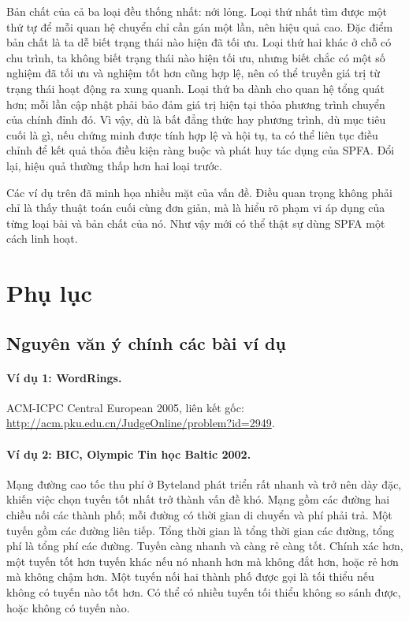 \documentclass[11pt]{article}
\begin{document}
Bản chất của cả ba loại đều thống nhất: nới lỏng. Loại thứ nhất tìm được một
thứ tự để mỗi quan hệ chuyển chỉ cần gán một lần, nên hiệu quả cao. Đặc điểm
bản chất là ta dễ biết trạng thái nào hiện đã tối ưu. Loại thứ hai khác ở chỗ
có chu trình, ta không biết trạng thái nào hiện tối ưu, nhưng biết chắc có một
số nghiệm đã tối ưu và nghiệm tốt hơn cũng hợp lệ, nên có thể truyền giá trị
từ trạng thái hoạt động ra xung quanh. Loại thứ ba dành cho quan hệ tổng quát
hơn; mỗi lần cập nhật phải bảo đảm giá trị hiện tại thỏa phương trình chuyển
của chính đỉnh đó. Vì vậy, dù là bất đẳng thức hay phương trình, dù mục tiêu
cuối là gì, nếu chứng minh được tính hợp lệ và hội tụ, ta có thể liên tục điều
chỉnh để kết quả thỏa điều kiện ràng buộc và phát huy tác dụng của SPFA. Đổi
lại, hiệu quả thường thấp hơn hai loại trước.

Các ví dụ trên đã minh họa nhiều mặt của vấn đề. Điều quan trọng không phải
chỉ là thấy thuật toán cuối cùng đơn giản, mà là hiểu rõ phạm vi áp dụng của
từng loại bài và bản chất của nó. Như vậy mới có thể thật sự dùng SPFA một
cách linh hoạt.

\section{Phụ lục}

\subsection{Nguyên văn ý chính các bài ví dụ}

\paragraph{Ví dụ 1: WordRings.}
ACM-ICPC Central European 2005, liên kết gốc:
\url{http://acm.pku.edu.cn/JudgeOnline/problem?id=2949}.

\paragraph{Ví dụ 2: BIC, Olympic Tin học Baltic 2002.}
Mạng đường cao tốc thu phí ở Byteland phát triển rất nhanh và trở nên dày đặc,
khiến việc chọn tuyến tốt nhất trở thành vấn đề khó. Mạng gồm các đường hai
chiều nối các thành phố; mỗi đường có thời gian di chuyển và phí phải trả.
Một tuyến gồm các đường liên tiếp. Tổng thời gian là tổng thời gian các đường,
tổng phí là tổng phí các đường. Tuyến càng nhanh và càng rẻ càng tốt. Chính
xác hơn, một tuyến tốt hơn tuyến khác nếu nó nhanh hơn mà không đắt hơn, hoặc
rẻ hơn mà không chậm hơn. Một tuyến nối hai thành phố được gọi là tối thiểu
nếu không có tuyến nào tốt hơn. Có thể có nhiều tuyến tối thiểu không so sánh
được, hoặc không có tuyến nào.
\end{document}
